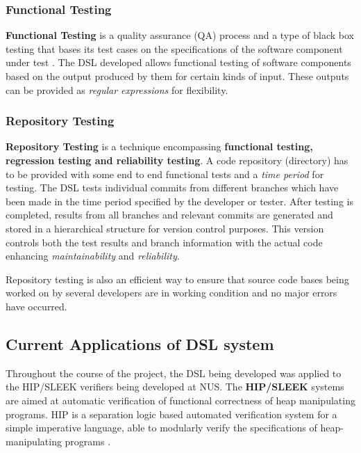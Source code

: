 \subsubsection{Functional Testing}

\textbf{Functional Testing} is a quality assurance (QA) process and a type of black box testing that bases its test cases on the specifications of the software component under test \cite{Hetzel88}. The DSL developed allows functional testing of software components based on the output produced by them for certain kinds of input. These outputs can be provided as \textit{regular expressions} for flexibility.

\subsubsection{Repository Testing}

\textbf{Repository Testing} is a technique encompassing  \textbf{functional testing, regression testing and reliability testing}. A code repository (directory) has to be provided with some end to end functional tests and a \textit{time period } for testing. The DSL tests individual commits from different branches which have been made in the time period specified by the developer or tester. After testing is completed, results from all branches and relevant commits are generated and stored in a hierarchical structure for version control purposes. This version controls both the test results and branch information with the actual code enhancing \textit{maintainability} and \textit{reliability}.\bigskip

\noindent
Repository testing is also an efficient way to ensure that source code bases being worked on by several developers are in working condition and no major errors have occurred.

\newpage
\subsection{Current Applications of DSL system}

Throughout the course of the project, the DSL being developed was applied to the HIP/SLEEK verifiers being developed at NUS. The \textbf{HIP/SLEEK} systems are aimed at automatic verification of functional correctness of heap manipulating programs. HIP is a separation logic based automated verification system for a simple imperative language, able to modularly verify the specifications of heap-manipulating programs \cite{hipsleek}. 

